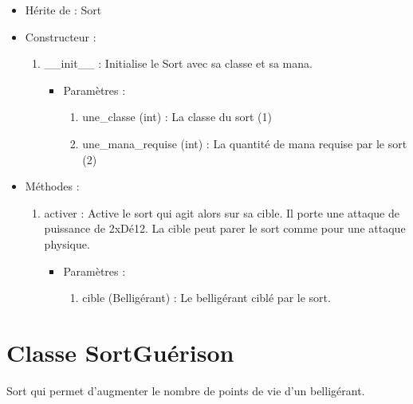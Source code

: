 \documentclass[12pt,pdftex,oneside]{article}
\begin{document}
  \begin{itemize}
  \item Hérite de : Sort


  \item Constructeur : 

  \begin{enumerate}
  \item \_\_init\_\_ : Initialise le Sort avec sa classe et sa mana.
    \begin{itemize}
    \item Paramètres : 
      \begin{enumerate}
      \item une\_classe (int) : La classe du sort (1)
      \item une\_mana\_requise (int) : La quantité de mana requise par le sort (2)
      \end{enumerate}
    \end{itemize}

  \end{enumerate}

  \item Méthodes : 

    \begin{enumerate}
    \item activer : Active le sort qui agit alors sur sa cible. Il porte une
      attaque de puissance de 2xDé12. La cible peut parer le sort comme
      pour une attaque physique.
      \begin{itemize}
      \item Paramètres : 
        \begin{enumerate}
        \item cible (Belligérant) : Le belligérant ciblé par le sort.
        \end{enumerate}
      \end{itemize}
    \end{enumerate}

  \end{itemize}

  \section {Classe SortGuérison}

  Sort qui permet d'augmenter le nombre de points de vie d'un belligérant.
\end{document}
